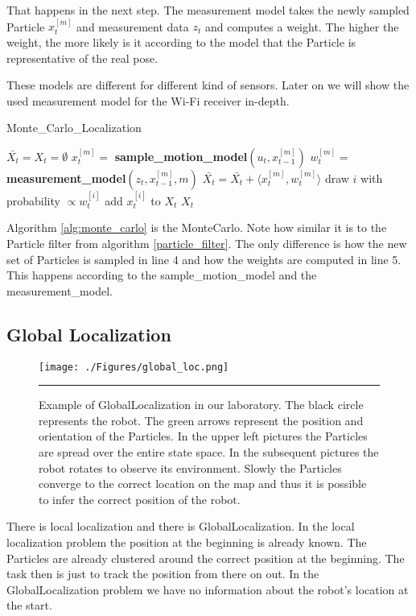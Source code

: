 That happens in the next step. The measurement model takes the newly sampled \gls{Particle} $x_t^{[m]}$ and measurement data $z_t$ and computes a weight. The higher the weight, the more likely is it according to the model that the \gls{Particle} is representative of the real pose. 

These models are different for different kind of sensors. Later on we will show the used measurement model for the Wi-Fi receiver in-depth. 

\begin{algorithm}
\caption{Monte\_Carlo\_Localization \citep[p.\ 252]{Thrun:2005:PR:1121596}}
\label{alg:monte_carlo}
\begin{algorithmic}[1]
\State $\bar{X_t} = X_t = \emptyset$
\State $x_t^{[m]} = $ \textbf{sample\_motion\_model}$(u_t,x_{t-1}^{[m]})$
\State $w_t^{[m]} = $ \textbf{measurement\_model}$(z_t,x_{t-1}^{[m]},m)$
\State $\bar{X_t} = \bar{X_t} + \langle x_t^{[m]},w_t^{[m]}\rangle$
\EndFor
{}
\State draw $i$ with probability $\propto w_t^{[i]}$
\State add $x_t^{[i]}$ to $X_t$
\EndFor
\State \Return $X_t$
\EndProcedure
\end{algorithmic}
\end{algorithm}

Algorithm \ref{alg:monte_carlo} is the \Gls{MonteCarlo}. Note how similar it is to the \gls{Particle} filter from algorithm \ref{particle_filter}. The only difference is how the new set of \gls{Particle}s is sampled in line 4 and how the weights are computed in line 5. This happens according to the sample\_motion\_model and the measurement\_model. 
\subsection{Global Localization}
\begin{figure}[htbp]
	\centering
		\texttt{[image: ./Figures/global\_loc.png]}
		\rule{35em}{0.5pt}
	\caption[Example of the \gls{GlobalLocalization}]{Example of \gls{GlobalLocalization} in our laboratory. The black circle represents the robot. The green arrows represent the position and orientation of the \gls{Particle}s. In the upper left pictures the \gls{Particle}s are spread over the entire state space. In the subsequent pictures the robot rotates to observe its environment. Slowly the \gls{Particle}s converge to the correct location on the map and thus it is possible to infer the correct position of the robot.}
	\label{fig:global_localization}
\end{figure}
There is local localization and there is \gls{GlobalLocalization}. In the local localization problem the position at the beginning is already known. The \gls{Particle}s are already clustered around the correct position at the beginning. The task then is just to track the position from there on out. In the \gls{GlobalLocalization} problem we have no information about the robot's location at the start.

